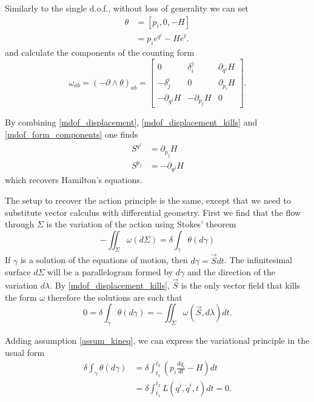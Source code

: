\documentclass[fleqn,10pt]{wlscirep}
\begin{document}
Similarly to the single d.o.f., without loss of generality we can set
\begin{equation}\label{mdof_potential_expression}
\begin{aligned}
	\theta &= [p_i, 0, -H] \\
	&= p_i e^{q^i} - H e^t.
\end{aligned}
\end{equation}
and calculate the components of the counting form
\begin{equation}\label{mdof_form_components}
	\omega_{ab} = (-\partial\wedge\theta)_{ab} = \begin{bmatrix}
		0 & \delta^j_i & \partial_{q^i} H \\
		-\delta^i_j & 0 & \partial_{p_i} H \\
		-\partial_{q^j} H & -\partial_{p_j} H & 0
	\end{bmatrix}.
\end{equation}

By combining \ref{mdof_displacement}, \ref{mdof_displacement_kills} and \ref{mdof_form_components} one finds
\begin{equation}\label{mdof_Ham_eq}
\begin{aligned}
	S^{q^j} &= \partial_{p_j} H \\
	S^{p_j} &= - \partial_{q^j} H
\end{aligned}
\end{equation}
which recovers Hamilton's equations.

The setup to recover the action principle is the same, except that we need to substitute vector calculus with differential geometry. First we find that the flow through $\Sigma$ is the variation of the action using Stokes' theorem
\begin{equation}\label{mdof_action}
	- \iint_{\Sigma} \omega(d\Sigma) = \delta \int_{\gamma} \theta(d\gamma) 
\end{equation}
If $\gamma$ is a solution of the equations of motion, then $d\gamma = \vec{S} dt$. The infinitesimal surface $d\Sigma$ will be a parallelogram formed by $d\gamma$ and the direction of the variation $d\lambda$. By \ref{mdof_displacement_kills}, $\vec{S}$ is the only vector field that kills the form $\omega$ therefore the solutions are such that
\begin{equation}\label{mdof_stationary_action}
		0 = \delta \int_{\gamma} \theta(d\gamma) = - \iint_{\Sigma} \omega(\vec{S}, d\lambda) dt. 
\end{equation}

Adding assumption \ref{assum_kineq}, we can express the variational principle in the usual form
\begin{equation}\label{mdof_Lagrangian}
	\begin{aligned}
		\delta \int_{\gamma} \theta(d\gamma) &= \delta \int^{t_2}_{t_1}\left( p_i \frac{dq_i}{dt} - H \right) dt \\
		 &= \delta \int^{t_2}_{t_1}L(q^i, \dot{q}^i, t) dt = 0.
	\end{aligned}
\end{equation}
\end{document}
